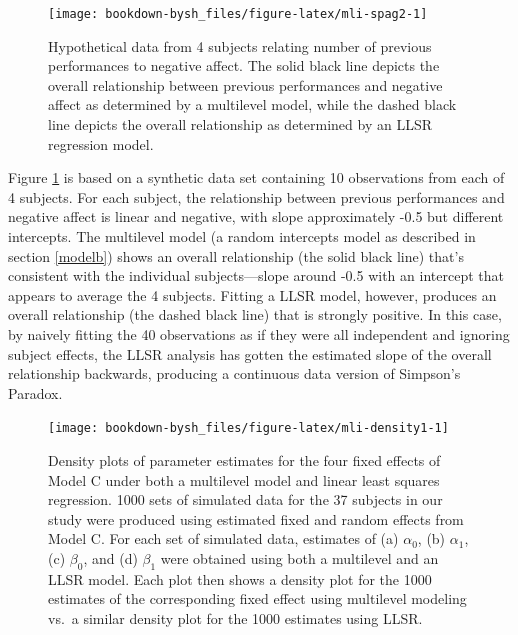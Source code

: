 \documentclass[
]{krantz}
\begin{document}
\begin{figure}

{\centering \texttt{[image: bookdown-bysh\_files/figure-latex/mli-spag2-1]} 

}

\caption{Hypothetical data from 4 subjects relating number of previous performances to negative affect.  The solid black line depicts the overall relationship between previous performances and negative affect as determined by a multilevel model, while the dashed black line depicts the overall relationship as determined by an LLSR regression model.}\label{fig:mli-spag2}
\end{figure}

Figure \ref{fig:mli-spag2} is based on a synthetic data set containing 10 observations from each of 4 subjects. For each subject, the relationship between previous performances and negative affect is linear and negative, with slope approximately -0.5 but different intercepts. The multilevel model (a random intercepts model as described in section \ref{modelb}) shows an overall relationship (the solid black line) that's consistent with the individual subjects---slope around -0.5 with an intercept that appears to average the 4 subjects. Fitting a LLSR model, however, produces an overall relationship (the dashed black line) that is strongly positive. In this case, by naively fitting the 40 observations as if they were all independent and ignoring subject effects, the LLSR analysis has gotten the estimated slope of the overall relationship backwards, producing a continuous data version of Simpson's Paradox.



\begin{figure}

{\centering \texttt{[image: bookdown-bysh\_files/figure-latex/mli-density1-1]} 

}

\caption{Density plots of parameter estimates for the four fixed effects of Model C under both a multilevel model and linear least squares regression. 1000 sets of simulated data for the 37 subjects in our study were produced using estimated fixed and random effects from Model C. For each set of simulated data, estimates of (a) \(\alpha_{0}\), (b) \(\alpha_{1}\), (c) \(\beta_{0}\), and (d) \(\beta_{1}\) were obtained using both a multilevel and an LLSR model. Each plot then shows a density plot for the 1000 estimates of the corresponding fixed effect using multilevel modeling vs.~a similar density plot for the 1000 estimates using LLSR.}\label{fig:mli-density1}
\end{figure}
\end{document}
